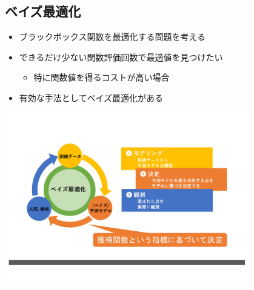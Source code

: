 \documentclass[dvipdfmx, 10.5pt]{beamer}
\begin{document}
\subsection{ベイズ最適化}
\begin{frame}{\insertsubsection}

	\begin{itemize}
		\item ブラックボックス関数を最適化する問題を考える
		\vspace{2pt}
		\item \textcolor{myorange}{できるだけ少ない関数評価回数で最適値を見つけたい}
		\begin{itemize}
			\item 特に関数値を得るコストが高い場合
		\end{itemize}
		\vspace{1pt}
		\item 有効な手法として\textcolor{myorange}{ベイズ最適化}がある
	\end{itemize}
	\vspace{10pt}
	\begin{center}
		\includegraphics[width=0.80\textwidth]{./Fig/BO.pdf}
	\end{center}

\end{frame}
\end{document}

